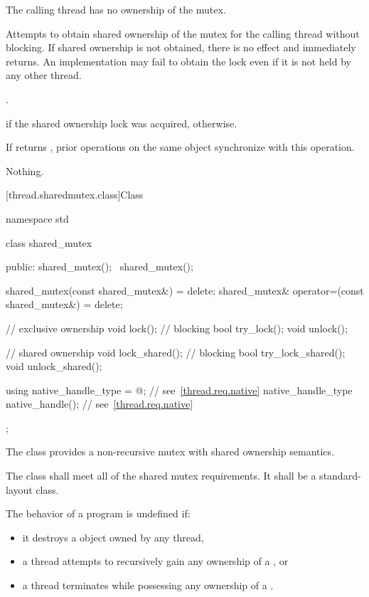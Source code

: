 \begin{itemdescr}
\pnum
\requires The calling thread has no ownership of the mutex.

\pnum
\effects
Attempts to obtain shared ownership of the mutex for the calling
thread without blocking. If shared ownership is not obtained, there is no
effect and  immediately returns. An implementation
may fail to obtain the lock even if it is not held by any other thread.

\pnum
\returntype {}.

\pnum
\returns
{} if the shared ownership lock was acquired, 
otherwise.

\pnum
\sync
If  returns , prior 
operations on the same object synchronize with this
operation.

\pnum
\throws
Nothing.
\end{itemdescr}

[thread.sharedmutex.class]{Class }

%
\begin{codeblock}
namespace std {
  class shared_mutex {
  public:
    shared_mutex();
    ~shared_mutex();

    shared_mutex(const shared_mutex&) = delete;
    shared_mutex& operator=(const shared_mutex&) = delete;

    // exclusive ownership
    void lock();                // blocking
    bool try_lock();
    void unlock();

    // shared ownership
    void lock_shared();         // blocking
    bool try_lock_shared();
    void unlock_shared();

    using native_handle_type = @\impdefnc@;          // see~\ref{thread.req.native}
    native_handle_type native_handle();                         // see~\ref{thread.req.native}
  };
}
\end{codeblock}

\pnum
The class  provides a non-recursive mutex
with shared ownership semantics.

\pnum
The class  shall meet all of the
shared mutex requirements.
It shall be a standard-layout class.

\pnum
The behavior of a program is undefined if:
\begin{itemize}
\item it destroys a  object owned by any thread,
\item a thread attempts to recursively gain any ownership of a , or
\item a thread terminates while possessing any ownership of a .
\end{itemize}

